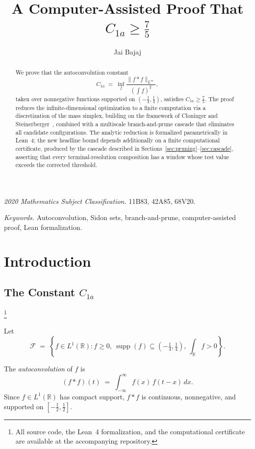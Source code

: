 \documentclass[11pt, letterpaper]{article}
\title{\texorpdfstring{%
  \bfseries A Computer-Assisted Proof That $C_{1a}\ge \tfrac75$
}{A Computer-Assisted Proof That C1a >= 7/5}}
\author{Jai Bajaj}
\date{}
\theoremstyle{paperplain}
\theoremstyle{paperdef}
\newcommand{\R}{\mathbb{R}}
\newcommand{\supp}{\operatorname{supp}}
\begin{document}
\maketitle

\begin{abstract}
We prove that the autoconvolution constant
\[
  C_{1a}
  \;=\;
  \inf_f \frac{\|f*f\|_{L^\infty}}{\left(\int f\right)^2},
\]
taken over nonnegative functions supported on
$(-\tfrac14,\tfrac14)$, satisfies $C_{1a}\ge \tfrac75$.
The proof reduces the infinite-dimensional optimization to a finite
computation via a discretization of the mass simplex, building on the
framework of Cloninger and Steinerberger~\cite{CS17}, combined with a
multiscale branch-and-prune cascade that eliminates all candidate
configurations.  The analytic reduction is formalized parametrically
in Lean~4; the new headline bound depends additionally on a finite
computational certificate, produced by the cascade described in
Sections~\ref{sec:pruning}--\ref{sec:cascade}, asserting that every
terminal-resolution composition has a window whose test value exceeds
the corrected threshold.
\end{abstract}
\noindent\textit{2020 Mathematics Subject Classification.}
11B83, 42A85, 68V20.

\smallskip

\noindent\textit{Keywords.}
Autoconvolution, Sidon sets, branch-and-prune, computer-assisted proof,
Lean formalization.

\medskip

\section{Introduction}\label{sec:intro}

\subsection{The Constant \texorpdfstring{$C_{1a}$}{C1a}}\footnote{All
  source code, the Lean~4 formalization, and the computational
  certificate are available at the accompanying repository.}

Let
\[
  \mathcal{F}
  \;=\;
  \left\{
    f \in L^1(\R) :
    f \ge 0,\ 
    \supp(f) \subseteq \left(-\tfrac14,\tfrac14\right),\
    \int_{\R} f > 0
  \right\}.
\]

The \emph{autoconvolution} of $f$ is
\[
  (f * f)(t) \;=\; \int_{-\infty}^{\infty} f(x)\, f(t - x)\, dx.
\]
Since $f \in L^1(\R)$ has compact support, $f*f$ is continuous,
nonnegative, and supported on $[-\tfrac12,\tfrac12]$.
\end{document}
